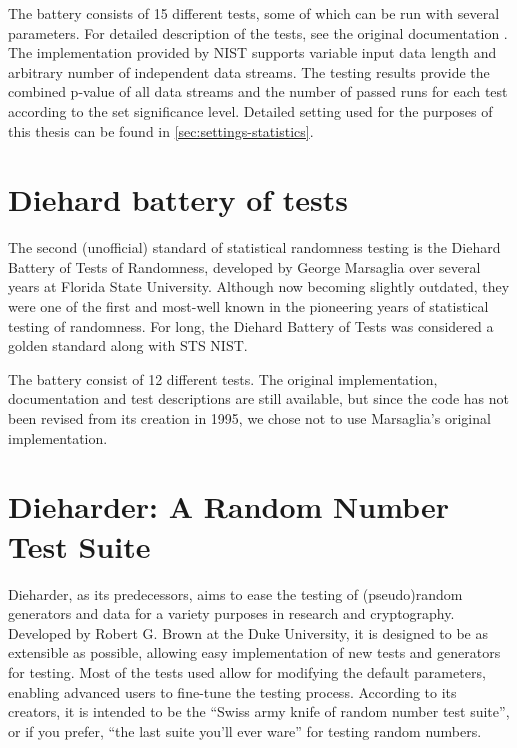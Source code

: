 \documentclass[12pt,oneside]{fithesis2}
\begin{document}
The battery consists of 15 different tests, some of which can be run with several parameters. 
For detailed description of the tests, see the original documentation \parencite{sts-nist-documentation}. 
The implementation provided by NIST supports variable input data length and arbitrary number of independent data streams. 
The testing results provide the combined p-value of all data streams and the number of passed runs for each test 
according to the set significance level. 
Detailed setting used for the purposes of this thesis can be found in \autoref{sec:settings-statistics}.

\section{Diehard battery of tests}
\label{sec:diehard}

The second (unofficial) standard of statistical randomness testing is the Diehard Battery of Tests of Randomness, 
developed by George Marsaglia over several years at Florida State University. \parencite{diehard} 
Although now becoming slightly outdated, they were one of the first and most-well known 
in the pioneering years of statistical testing of randomness. 
For long, the Diehard Battery of Tests was considered a golden standard along with STS NIST.

The battery consist of 12 different tests. The original implementation, documentation and test descriptions are still available,
but since the code has not been revised from its creation in 1995, we chose not to use Marsaglia's original implementation.

\section{Dieharder: A Random Number Test Suite}
\label{sec:dieharder}

Dieharder, as its predecessors, aims to ease the testing of (pseudo)random generators and data for a variety purposes in research 
and cryptography. Developed by Robert G. Brown at the Duke University, it is designed to be as extensible as possible, 
allowing easy implementation of new tests and generators for testing. Most of the tests used allow for 
modifying the default parameters, enabling advanced users to fine-tune the testing process.
According to its creators, it is intended to be the ``Swiss army knife of random number test suite'', 
or if you prefer, ``the last suite you'll ever ware'' for testing random numbers. \parencite{dieharder}
\end{document}
